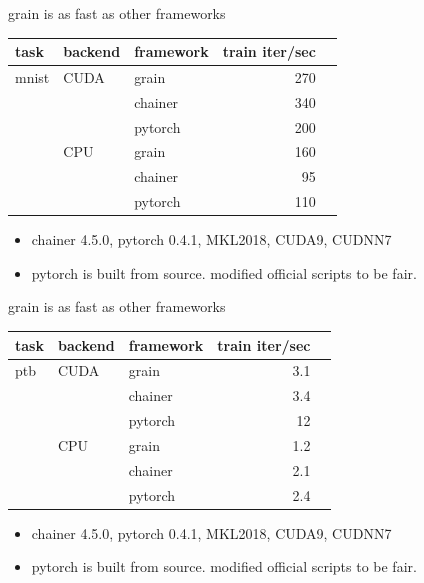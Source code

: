 \documentclass[aspectratio=169,
  14pt,xcolor=dvipsnames,table,professional font,dvipdfmx]{beamer}
\begin{document}
\begin{frame}{grain is as \alert{fast} as other frameworks}
    \begin{table}
	\begin{tabular}{lllrr}
      \toprule
      task & backend  & framework & train iter/sec \\
      \midrule
      mnist & CUDA & grain      & 270 \\
            &      & chainer    & 340 \\
            &      & pytorch    & 200 \\
      \midrule
            & CPU  & grain      & 160 \\
            &      & chainer    &  95 \\
            &      & pytorch    & 110 \\
      \bottomrule
	\end{tabular}
    \end{table}
    \begin{itemize}
      \item chainer 4.5.0, pytorch 0.4.1, MKL2018, CUDA9, CUDNN7
      \item pytorch is built from source. modified official scripts to be fair.
    \end{itemize}
\end{frame}

\begin{frame}{grain is as \alert{fast} as other frameworks}
    \begin{table}
	\begin{tabular}{lllrr}
      \toprule
      task & backend  & framework & train iter/sec \\
      \midrule
      ptb   & CUDA & grain      & 3.1  \\
            &      & chainer    & 3.4 \\
            &      & pytorch    & 12 \\
      \midrule
            & CPU  & grain      & 1.2 \\
            &      & chainer    & 2.1 \\
            &      & pytorch    & 2.4 \\
      \bottomrule
	\end{tabular}
    \end{table}
    \begin{itemize}
      \item chainer 4.5.0, pytorch 0.4.1, MKL2018, CUDA9, CUDNN7
      \item pytorch is built from source. modified official scripts to be fair.
    \end{itemize}
\end{frame}
\end{document}
